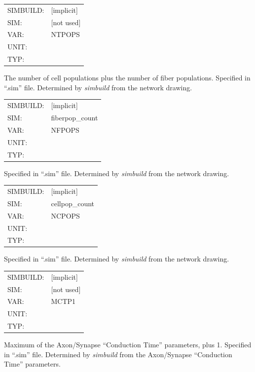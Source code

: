 \documentclass[12pt,openany,oneside]{book}
\newcommand{\prog}[1]{\textit{{#1}}}
\newcommand{\ext}[1]{{{``.#1''}}}
\newcommand{\inquotes}[1]{{{``#1''}}}
\begin{document}
\begin{flushleft}
\begin{tabular}{@{}ll@{}}
SIMBUILD: & [implicit]\\
SIM: & [not used]\\
VAR: & NTPOPS\\
UNIT: &\\
TYP: &\\
\end{tabular}
\end{flushleft}
\noindent
The number of cell populations plus the number of fiber populations.
Specified in \ext{sim} file. Determined by \prog{simbuild} from the network
drawing.
\filbreak
\vspace{\baselineskip}

\begin{flushleft}
\begin{tabular}{@{}ll@{}}
SIMBUILD: & [implicit]\\
SIM: & fiberpop\_count\\
VAR: & NFPOPS\\
UNIT: &\\
TYP: &\\
\end{tabular}
\end{flushleft}
\noindent
Specified in \ext{sim} file. Determined by \prog{simbuild} from the network
drawing.
\filbreak
\vspace{\baselineskip}

\begin{flushleft}
\begin{tabular}{@{}ll@{}}
SIMBUILD: & [implicit]\\
SIM: & cellpop\_count\\
VAR: & NCPOPS\\
UNIT: &\\
TYP: &\\
\end{tabular}
\end{flushleft}
\noindent
Specified in \ext{sim} file. Determined by \prog{simbuild} from the network
drawing.
\filbreak
\vspace{\baselineskip}

\begin{flushleft}
\begin{tabular}{@{}ll@{}}
SIMBUILD: & [implicit]\\
SIM: & [not used]\\
VAR: & MCTP1\\
UNIT: &\\
TYP: &\\
\end{tabular}
\end{flushleft}
\noindent
Maximum of the Axon/Synapse \inquotes{Conduction Time} parameters, plus 1.
Specified in \ext{sim} file. Determined by \prog{simbuild} from the
Axon/Synapse \inquotes{Conduction Time} parameters.
\filbreak
\vspace{\baselineskip}
\end{document}
